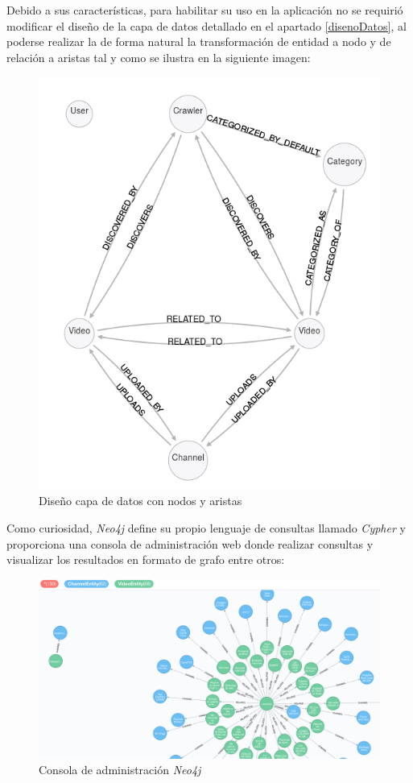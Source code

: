 \documentclass[11pt,a4paper]{article}
\begin{document}
Debido a sus características, para habilitar su uso en la aplicación no se requirió modificar el diseño de la capa de datos detallado en el apartado \ref{disenoDatos}, al poderse realizar la de forma natural la transformación de entidad a nodo y de relación a aristas tal y como se ilustra en la siguiente imagen:
\begin{figure}[H]
\centering
\includegraphics[scale=0.20]{desarrollo/DatabaseGraph.png}
\caption{Diseño capa de datos con nodos y aristas}
\end{figure}

Como curiosidad, \textit{Neo4j} define su propio lenguaje de consultas llamado \textit{Cypher} y proporciona una consola de administración web donde realizar consultas y visualizar los resultados en formato de grafo entre otros:
\begin{figure}[H]
\centering
\includegraphics[scale=0.20]{desarrollo/neo4j.png}
\caption{Consola de administración \textit{Neo4j}}
\end{figure}
\pagebreak 
\end{document}
